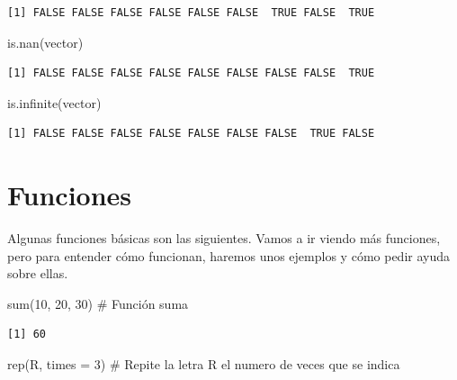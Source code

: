 \documentclass[
  letterpaper,
  DIV=11,
  numbers=noendperiod]{scrreprt}
\newenvironment{Shaded}{\begin{snugshade}}{\end{snugshade}}
\newcommand{\AttributeTok}[1]{\textcolor[rgb]{0.40,0.45,0.13}{#1}}
\newcommand{\CommentTok}[1]{\textcolor[rgb]{0.37,0.37,0.37}{#1}}
\newcommand{\DecValTok}[1]{\textcolor[rgb]{0.68,0.00,0.00}{#1}}
\newcommand{\FunctionTok}[1]{\textcolor[rgb]{0.28,0.35,0.67}{#1}}
\newcommand{\NormalTok}[1]{\textcolor[rgb]{0.00,0.23,0.31}{#1}}
\newcommand{\StringTok}[1]{\textcolor[rgb]{0.13,0.47,0.30}{#1}}
\begin{document}
\begin{verbatim}
[1] FALSE FALSE FALSE FALSE FALSE FALSE  TRUE FALSE  TRUE
\end{verbatim}

\begin{Shaded}
\begin{Highlighting}[]
\FunctionTok{is.nan}\NormalTok{(vector)}
\end{Highlighting}
\end{Shaded}

\begin{verbatim}
[1] FALSE FALSE FALSE FALSE FALSE FALSE FALSE FALSE  TRUE
\end{verbatim}

\begin{Shaded}
\begin{Highlighting}[]
\FunctionTok{is.infinite}\NormalTok{(vector)}
\end{Highlighting}
\end{Shaded}

\begin{verbatim}
[1] FALSE FALSE FALSE FALSE FALSE FALSE FALSE  TRUE FALSE
\end{verbatim}

\hypertarget{funciones}{%
\section{Funciones}\label{funciones}}

Algunas funciones básicas son las siguientes. Vamos a ir viendo más
funciones, pero para entender cómo funcionan, haremos unos ejemplos y
cómo pedir ayuda sobre ellas.

\begin{Shaded}
\begin{Highlighting}[]
\FunctionTok{sum}\NormalTok{(}\DecValTok{10}\NormalTok{, }\DecValTok{20}\NormalTok{, }\DecValTok{30}\NormalTok{)    }\CommentTok{\# Función suma}
\end{Highlighting}
\end{Shaded}

\begin{verbatim}
[1] 60
\end{verbatim}

\begin{Shaded}
\begin{Highlighting}[]
\FunctionTok{rep}\NormalTok{(}\StringTok{\textquotesingle{}R\textquotesingle{}}\NormalTok{, }\AttributeTok{times =} \DecValTok{3}\NormalTok{) }\CommentTok{\# Repite la letra R el numero de veces que se indica}
\end{Highlighting}
\end{Shaded}
\end{document}
